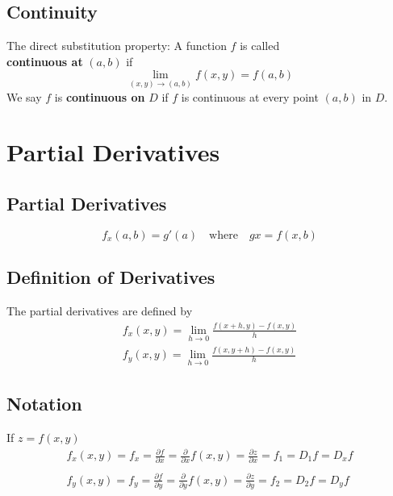 \documentclass{report}  %
\begin{document}
\subsection*{Continuity} 
The direct substitution property: A function $f$ is called \\
\textbf{continuous at} $(a, b)$ if 
\begin{equation}
	\lim_{(x,y) \to (a,b)} f(x, y) = f(a, b)
\end{equation}
We say $f$ is \textbf{continuous on} $D$ if $f$ is continuous at every point $(a, b)$ in $D$. 

\newpage

\section{Partial Derivatives}
\subsection*{Partial Derivatives}
\begin{equation}
	f_x (a, b) = g'(a) \quad \text{where} \quad g{x} = f(x, b)
\end{equation}	

\subsection*{Definition of Derivatives}
The partial derivatives are defined by
\begin{equation}
\begin{aligned}
	f_x(x,y) = \lim_{h \to 0} \frac{f(x+h,y)-f(x,y)}{h} \\
	f_y(x,y) = \lim_{h \to 0} \frac{f(x,y+h)-f(x,y)}{h}
\end{aligned}
\end{equation}

\subsection*{Notation}
If $z = f(x, y)$
\begin{equation*}  %
\begin{aligned}
	f_x(x,y) = f_x = \frac{\partial f}{\partial x} = 
	\frac{\partial }{\partial x} f(x, y) = \frac{\partial z}{\partial x} = 
	f_1 = D_1 f = D_x f	\\ \\
	f_y(x,y) = f_y = \frac{\partial f}{\partial y} = 
	\frac{\partial }{\partial y} f(x, y) = \frac{\partial z}{\partial y} = 
	f_2 = D_2 f = D_y f	
\end{aligned}
\end{equation*}
\end{document}
